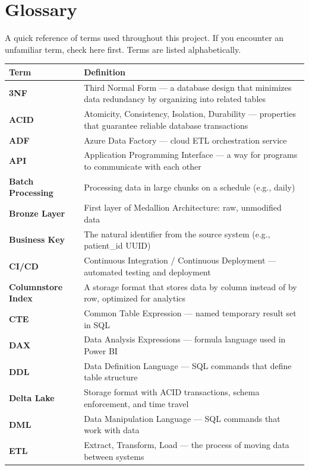 \documentclass[12pt, a4paper, oneside]{report}
\begin{document}
\chapter{Glossary}
\label{ch:glossary}

A quick reference of terms used throughout this project. If you encounter an unfamiliar term, check here first. Terms are listed alphabetically.

\begin{longtable}{>{\bfseries}p{4cm} p{9.5cm}}
    \toprule
    \textbf{Term} & \textbf{Definition} \\
    \midrule
    \endhead
    3NF & Third Normal Form --- a database design that minimizes data redundancy by organizing into related tables \\
    ACID & Atomicity, Consistency, Isolation, Durability --- properties that guarantee reliable database transactions \\
    ADF & Azure Data Factory --- cloud ETL orchestration service \\
    API & Application Programming Interface --- a way for programs to communicate with each other \\
    Batch Processing & Processing data in large chunks on a schedule (e.g., daily) \\
    Bronze Layer & First layer of Medallion Architecture: raw, unmodified data \\
    Business Key & The natural identifier from the source system (e.g., patient\_id UUID) \\
    CI/CD & Continuous Integration / Continuous Deployment --- automated testing and deployment \\
    Columnstore Index & A storage format that stores data by column instead of by row, optimized for analytics \\
    CTE & Common Table Expression --- named temporary result set in SQL \\
    DAX & Data Analysis Expressions --- formula language used in Power BI \\
    DDL & Data Definition Language --- SQL commands that define table structure \\
    Delta Lake & Storage format with ACID transactions, schema enforcement, and time travel \\
    DML & Data Manipulation Language --- SQL commands that work with data \\
    ETL & Extract, Transform, Load --- the process of moving data between systems \\

\end{longtable}
\end{document}
